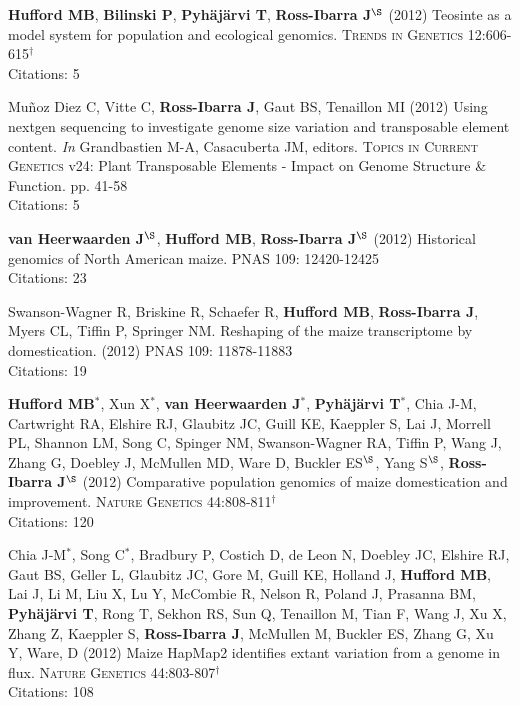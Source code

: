 \documentclass[letterpaper]{article}
\begin{document}
\begin{etaremune}
\item {\bf Hufford MB}, {\bf Bilinski P}, {\bf Pyh\"aj\"arvi T}, {\bf Ross-Ibarra J}$^\S$ (2012) Teosinte as a model system for population and ecological genomics. \textsc{Trends in Genetics} 12:606-615$^\dagger$
\\Citations: 5\\

\item Mu\~{n}oz Diez C, Vitte C, {\bf Ross-Ibarra J}, Gaut BS, Tenaillon MI (2012) Using nextgen sequencing to investigate genome size variation and transposable element content. \emph{In} Grandbastien M-A, Casacuberta JM, editors. \textsc{Topics in Current Genetics} v24: Plant Transposable Elements - Impact on Genome Structure \& Function. pp. 41-58 
\\Citations: 5\\

\item  {\bf van Heerwaarden J}$^\S$, {\bf Hufford MB}, {\bf Ross-Ibarra J}$^\S$ (2012) Historical genomics of North American maize. \textsc{PNAS} 109: 12420-12425
\\Citations: 23\\

\item Swanson-Wagner R, Briskine R, Schaefer R, {\bf Hufford MB}, {\bf Ross-Ibarra J}, Myers CL, Tiffin P, Springer NM.  Reshaping of the maize transcriptome by domestication. (2012) \textsc{PNAS}  109: 11878-11883
\\Citations: 19\\

\item {\bf Hufford MB}$^*$, Xun X$^*$, {\bf van Heerwaarden J}$^*$, {\bf Pyh\"aj\"arvi T}$^*$, Chia J-M, Cartwright RA, Elshire RJ, Glaubitz JC, Guill KE, Kaeppler S, Lai J, Morrell PL, Shannon LM, Song C, Spinger NM, Swanson-Wagner RA, Tiffin P, Wang J, Zhang G, Doebley J, McMullen MD, Ware D, Buckler ES$^\S$, Yang S$^\S$, {\bf Ross-Ibarra J}$^\S$ (2012) Comparative population genomics of maize domestication and improvement. \textsc{Nature Genetics} 44:808-811$^\dagger$
\\Citations: 120\\

\item  Chia J-M$^*$, Song C$^*$, Bradbury P, Costich D, de Leon N, Doebley JC, Elshire RJ, Gaut BS, Geller L, Glaubitz JC, Gore M, Guill KE, Holland J,  {\bf Hufford MB}, Lai J, Li M, Liu X, Lu Y, McCombie R, Nelson R, Poland J, Prasanna BM,  {\bf Pyh\"aj\"arvi T}, Rong T, Sekhon RS,  Sun Q, Tenaillon M, Tian F, Wang J, Xu X, Zhang Z, Kaeppler S, {\bf Ross-Ibarra J}, McMullen M, Buckler ES, Zhang G, Xu Y, Ware, D (2012) Maize HapMap2 identifies extant variation from a genome in flux. \textsc{Nature Genetics} 44:803-807$^\dagger$
\\Citations: 108\\


\end{etaremune}
\end{document}
